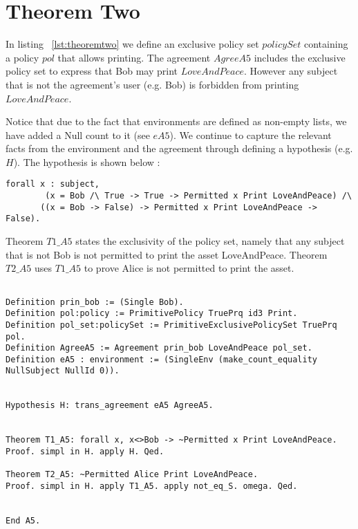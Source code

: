 \section{Theorem Two}

In listing ~\ref{lst:theoremtwo} we define an exclusive policy set $policySet$ containing a policy $pol$ that allows printing. The agreement $AgreeA5$ includes the exclusive policy set to express that Bob may print $LoveAndPeace$. However any subject that is not the agreement's user (e.g. Bob) is forbidden from printing $LoveAndPeace$. 

Notice that due to the fact that environments are defined as non-empty lists, we have added a Null count to it (see $eA5$). We continue to capture the relevant facts from the environment and the agreement through defining a hypothesis (e.g. $H$). The hypothesis is shown below : 

\lstset{language=Coq}
\begin{lstlisting}[frame=single, caption={Hypothesis for Theorem Two}, label={lst:theoremtwohypo}]
forall x : subject, 
        (x = Bob /\ True -> True -> Permitted x Print LoveAndPeace) /\
       ((x = Bob -> False) -> Permitted x Print LoveAndPeace -> False). 
\end{lstlisting}

Theorem $T1\_A5$ states the exclusivity of the policy set, namely that any subject that is not Bob is not permitted to print the asset LoveAndPeace. Theorem $T2\_A5$ uses $T1\_A5$ to prove Alice is not permitted to print the asset.

\lstset{language=Coq}
\begin{lstlisting}[frame=single, caption={Theorem Two},label={lst:theoremtwo}]

Definition prin_bob := (Single Bob).
Definition pol:policy := PrimitivePolicy TruePrq id3 Print.
Definition pol_set:policySet := PrimitiveExclusivePolicySet TruePrq pol.
Definition AgreeA5 := Agreement prin_bob LoveAndPeace pol_set.
Definition eA5 : environment := (SingleEnv (make_count_equality NullSubject NullId 0)).


Hypothesis H: trans_agreement eA5 AgreeA5.


Theorem T1_A5: forall x, x<>Bob -> ~Permitted x Print LoveAndPeace.
Proof. simpl in H. apply H. Qed.

Theorem T2_A5: ~Permitted Alice Print LoveAndPeace.
Proof. simpl in H. apply T1_A5. apply not_eq_S. omega. Qed.


End A5.


\end{lstlisting}






